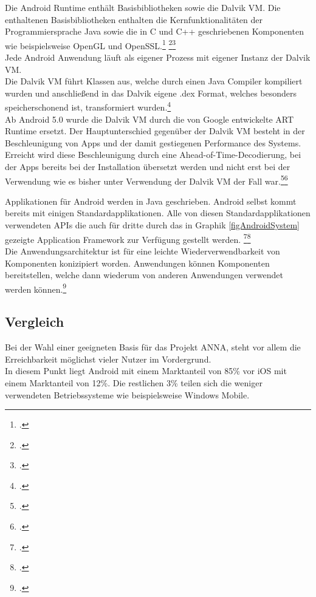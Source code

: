 Die Android Runtime enthält Basisbibliotheken sowie die Dalvik \ac{VM}. Die enthaltenen Basisbibliotheken enthalten die Kernfunktionalitäten der Programmiersprache Java sowie die in C und C++ geschriebenen Komponenten wie beispielsweise OpenGL und OpenSSL.\footcite[vgl.:][S. 9]{einfAndroid} \footcite[vgl.:][S. 27]{androidHandbuch}\footcite[vgl.:][S. 4 f]{braehler:2010}\\
Jede Android Anwendung läuft als eigener Prozess mit eigener Instanz der Dalvik \ac{VM}.\\
Die Dalvik \ac{VM} führt Klassen aus, welche durch einen Java Compiler kompiliert wurden und anschließend in das Dalvik eigene .dex Format, welches besonders speicherschonend ist, transformiert wurden.\footcite[vgl.:][]{androidVSiosArchitekture}\\
Ab Android 5.0 wurde die Dalvik \ac{VM} durch die von Google entwickelte ART Runtime ersetzt. Der Hauptunterschied gegenüber der Dalvik \ac{VM} besteht in der Beschleunigung von Apps und der damit gestiegenen Performance des Systems. Erreicht wird diese Beschleunigung durch eine Ahead-of-Time-Decodierung, bei der Apps bereits bei der Installation übersetzt werden und nicht erst bei der Verwendung wie es bisher unter Verwendung der Dalvik \ac{VM} der Fall war.\footcite[vgl.:][]{artvsdalvik}\footcite[vgl.:][S. 27 f.]{androidHandbuch}

Applikationen für Android werden in Java geschrieben. Android selbst kommt bereits mit einigen Standardapplikationen. Alle von diesen Standardapplikationen verwendeten \ac{API}s die auch für dritte durch das in Graphik \ref{figAndroidSystem} gezeigte Application Framework zur Verfügung gestellt werden. \footcite[vgl.:][S. 10 ff.]{einfAndroid}\footcite[vgl.:][S. 5]{braehler:2010}\\
Die Anwendungsarchitektur ist für eine leichte Wiederverwendbarkeit von Komponenten konizipiert worden. Anwendungen können Komponenten bereitstellen, welche dann wiederum von anderen Anwendungen verwendet werden können.\footcite[vgl.:][]{androidVSiosArchitekture}


\subsection{Vergleich}
Bei der Wahl einer geeigneten Basis für das Projekt \ac{ANNA}, steht vor allem die Erreichbarkeit möglichst vieler Nutzer im Vordergrund.\\
In diesem Punkt liegt Android mit einem Marktanteil von 85\% vor iOS mit einem Marktanteil von 12\%. Die restlichen 3\% teilen sich die weniger verwendeten Betriebssysteme wie beispielsweise Windows Mobile.

